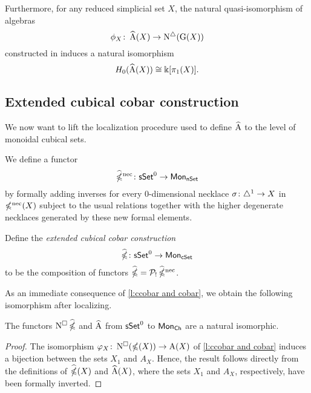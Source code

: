 Furthermore, for any reduced simplicial set $X$, the natural quasi-isomorphism of algebras
\[
\phi_X \colon \operatorname{\widehat{A}}(X) \to \operatorname{N^{\triangle}}(\operatorname{G}(X))
\]
constructed in \cite{hess2010cobar} induces a natural isomorphism
\[
H_0(\operatorname{\widehat{A}}(X)) \cong \Bbbk[\pi_1(X)].
\]

\subsection{Extended cubical cobar construction} \label{ss:extended cubical cobar}

We now want to lift the localization procedure used to define $\operatorname{\widehat{A}}$ to the level of monoidal cubical sets.

We define a functor
\[
\operatorname{\widehat{\mathbb{\Omega}}^{\mathrm{nec}}} \colon \mathsf{sSet}^0 \to \mathsf{Mon}_{\mathsf{nSet}}
\]
by formally adding inverses for every $0$-dimensional necklace $\sigma \colon \triangle^1 \to X$ in $\operatorname{\mathbb{\Omega}^{\mathrm{nec}}}(X)$ subject to the usual relations together with the higher degenerate necklaces generated by these new formal elements.

Define the \textit{extended cubical cobar construction}
\[
\operatorname{\widehat{\mathbb{\Omega}}} \colon \mathsf{sSet}^0 \to \mathsf{Mon}_{\mathsf{cSet}}
\]
to be the composition of functors $\operatorname{\widehat{\mathbb{\Omega}}} = \mathcal{P}_{!} \operatorname{\widehat{\mathbb{\Omega}}^{\mathrm{nec}}}$.

As an immediate consequence of \cref{l:ccobar and cobar}, we obtain the following isomorphism after localizing.

\begin{corollary}\label{c:e-ccobar and e-cobar}
	The functors $\operatorname{N^{\square}}\operatorname{\widehat{\mathbb{\Omega}}}$ and $\operatorname{\widehat{A}}$ from $\mathsf{sSet}^0$ to $\mathsf{Mon}_{\mathsf{Ch}}$ are a natural isomorphic.
\end{corollary}

\begin{proof}
	The isomorphism $\varphi_X \colon \operatorname{N^{\square}}(\operatorname{\mathbb{\Omega}}(X))\to \operatorname{A}(X)$
	of \cref{l:ccobar and cobar} induces a bijection between the sets
	$X_1$ and $A_X$.
	Hence, the result follows directly from the definitions of $\operatorname{\widehat{\mathbb{\Omega}}}(X)$ and $\operatorname{\widehat{A}}(X)$, where the sets $X_1$ and $A_X$, respectively, have been formally inverted.
\end{proof}